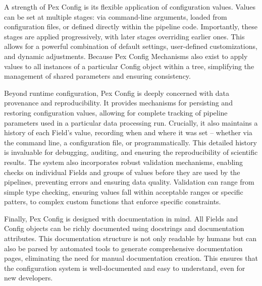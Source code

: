 A strength of Pex Config is its flexible application of configuration values.
Values can be set at multiple stages: via command-line arguments, loaded from configuration files, or defined directly within the pipeline code.
Importantly, these stages are applied progressively, with later stages overriding earlier ones.
This allows for a powerful combination of default settings, user-defined customizations, and dynamic adjustments.
Because Pex Config 
Mechanisms also exist to apply values to all instances of a particular Config object within a tree, simplifying the management of shared parameters and ensuring consistency.


Beyond runtime configuration, Pex Config is deeply concerned with data provenance and reproducibility.
It provides mechanisms for persisting and restoring configuration values, allowing for complete tracking of pipeline parameters used in a particular data processing run.
Crucially, it also maintains a history of each Field’s value, recording when and where it was set – whether via the command line, a configuration file, or programmatically.
This detailed history is invaluable for debugging, auditing, and ensuring the reproducibility of scientific results.
The system also incorporates robust validation mechanisms, enabling checks on individual Fields and groups of values before they are used by the pipelines, preventing errors and ensuring data quality.
Validation can range from simple type checking, ensuring values fall within acceptable ranges or specific patters, to complex custom functions that enforce specific constraints.


Finally, Pex Config is designed with documentation in mind.
All Fields and Config objects can be richly documented using docstrings and documentation attributes.
This documentation structure is not only readable by humans but can also be parsed by automated tools to generate comprehensive documentation pages, eliminating the need for manual documentation creation.
This ensures that the configuration system is well-documented and easy to understand, even for new developers.

